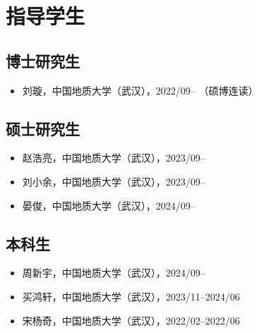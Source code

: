 \section{指导学生}

\subsection{博士研究生}
\begin{itemize}
\item 刘璇，中国地质大学（武汉），2022/09-- （硕博连读）
\end{itemize}

\subsection{硕士研究生}
\begin{itemize}
\item 赵浩亮，中国地质大学（武汉），2023/09--
\item 刘小余，中国地质大学（武汉），2023/09--
\item 晏俊，中国地质大学（武汉），2024/09--
\end{itemize}

\subsection{本科生}
\begin{itemize}
\item 周新宇，中国地质大学（武汉），2024/09--
\item 买鸿轩，中国地质大学（武汉），2023/11--2024/06
\item 宋杨奇，中国地质大学（武汉），2022/02--2022/06
\end{itemize}
